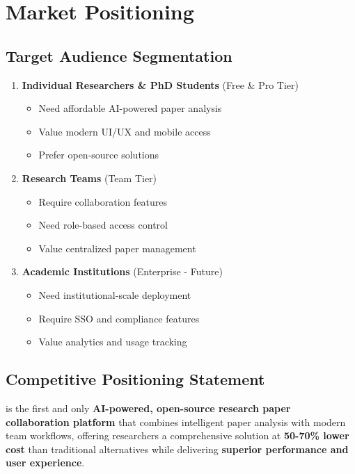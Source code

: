 \section{Market Positioning}
\label{sec:market-positioning}

\subsection{Target Audience Segmentation}

\begin{enumerate}[leftmargin=*]
    \item \textbf{Individual Researchers \& PhD Students} (Free \& Pro Tier)
    \begin{itemize}
        \item Need affordable AI-powered paper analysis
        \item Value modern UI/UX and mobile access
        \item Prefer open-source solutions
    \end{itemize}
    
    \item \textbf{Research Teams} (Team Tier)
    \begin{itemize}
        \item Require collaboration features
        \item Need role-based access control
        \item Value centralized paper management
    \end{itemize}
    
    \item \textbf{Academic Institutions} (Enterprise - Future)
    \begin{itemize}
        \item Need institutional-scale deployment
        \item Require SSO and compliance features
        \item Value analytics and usage tracking
    \end{itemize}
\end{enumerate}

\subsection{Competitive Positioning Statement}

\begin{infobox}[Positioning]
\textbf{\projectname{}} is the first and only \textbf{AI-powered, open-source research paper collaboration platform} that combines intelligent paper analysis with modern team workflows, offering researchers a comprehensive solution at \textbf{50-70\% lower cost} than traditional alternatives while delivering \textbf{superior performance and user experience}.
\end{infobox}

